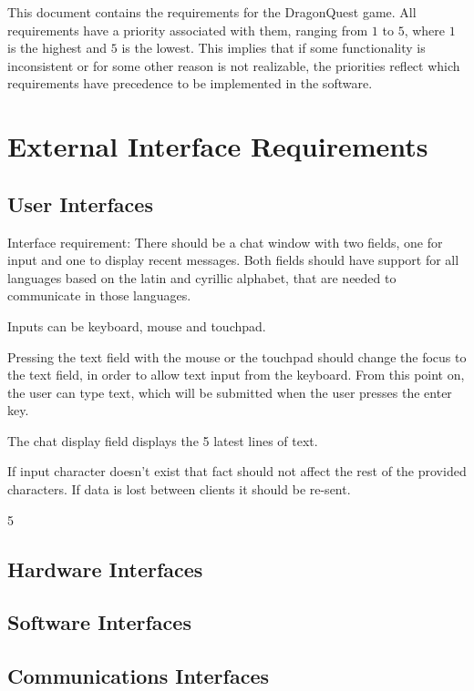 
This document contains the requirements for the DragonQuest game. All requirements have a priority associated with them, ranging from $1$ to $5$, where $1$ is the highest and $5$ is the lowest. This implies that if some functionality is inconsistent or for some other reason is not realizable, the priorities reflect which requirements have precedence to be implemented in the software.

\section{External Interface Requirements}
\subsection{User Interfaces}

Interface requirement: There should be a chat window with two fields, one for input and one to display recent messages. Both fields should have support for all languages based on the latin and cyrillic alphabet, that are needed to communicate in those languages.

Inputs can be keyboard, mouse and touchpad.

Pressing the text field with the mouse or the touchpad should change the focus to the text field, in order to allow text input from the keyboard. From this point on, the user can type text, which will be submitted when the user presses the enter key. 

The chat display field displays the 5 latest lines of text. 

If input character doesn't exist that fact should not affect the rest of the provided characters. If data is lost between clients it should be re-sent.

5

\stoprequirement

\subsection{Hardware Interfaces}
\subsection{Software Interfaces}
\subsection{Communications Interfaces}
